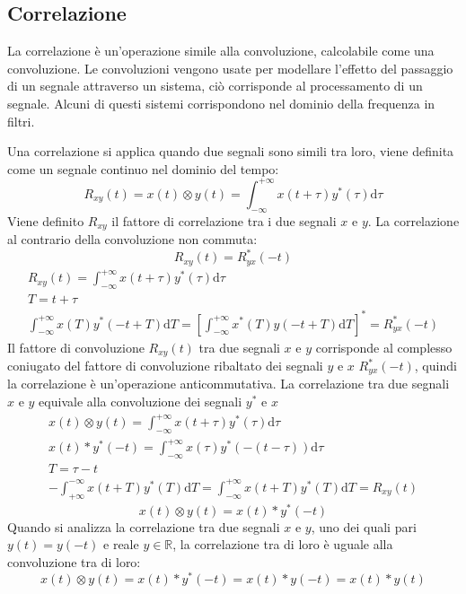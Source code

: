\documentclass{article}
\newcommand{\df}{\mathrm{d}}
\numberwithin{equation}{subsection}
\begin{document}
\subsection{Correlazione}
\label{sec:correlazione}
La correlazione è un'operazione simile alla convoluzione, calcolabile come una convoluzione. Le convoluzioni vengono usate per modellare l'effetto del passaggio di un segnale 
attraverso un sistema, ciò corrisponde al processamento di un segnale. Alcuni di questi sistemi corrispondono nel dominio della frequenza in filtri. 


Una correlazione si applica quando due segnali sono simili tra loro, viene definita come un segnale continuo nel dominio del tempo:
\begin{equation}
    R_{xy}(t)=x(t)\otimes y(t)=\int_{-\infty}^{+\infty}x(t+\tau)y^*(\tau)\df\tau
\end{equation}
Viene definito $R_{xy}$ il fattore di correlazione tra i due segnali $x$ e $y$. La correlazione al contrario della convoluzione non commuta: 
\begin{equation}
    R_{xy}(t)=R_{yx}^*(-t)
\end{equation}
\begin{gather*}
    \displaystyle R_{xy}(t)=\int_{-\infty}^{+\infty}x(t+\tau)y^*(\tau)\df\tau\\
    T=t+\tau\\
    \displaystyle\int_{-\infty}^{+\infty}x(T)y^*(-t+T)\df T=\left[\int_{-\infty}^{+\infty}x^*(T)y(-t+T)\df T\right]^*=R_{yx}^*(-t)
\end{gather*}
Il fattore di convoluzione $R_{xy}(t)$ tra due segnali $x$ e $y$ corrisponde al complesso coniugato del fattore di convoluzione ribaltato dei segnali $y$ e $x$ $R_{yx}^*(-t)$, 
quindi la correlazione è un'operazione anticommutativa. La correlazione tra due segnali $x$ e $y$ equivale alla convoluzione dei segnali $y^*$ e $x$
\begin{gather*}
    x(t)\otimes y(t)=\displaystyle\int_{-\infty}^{+\infty}x(t+\tau)y^*(\tau)\df\tau\\
    x(t)*y^*(-t)=\displaystyle\int_{-\infty}^{+\infty}x(\tau)y^*(-(t-\tau))\df\tau\\
    T=\tau-t\\
    -\int_{+\infty}^{-\infty}x(t+T)y^*(T)\df T=\int_{-\infty}^{+\infty}x(t+T)y^*(T)\df T=R_{xy}(t)
\end{gather*}
\begin{equation}
    x(t)\otimes y(t)=x(t)*y^*(-t)
\end{equation}
Quando si analizza la correlazione tra due segnali $x$ e $y$, uno dei quali pari $y(t)=y(-t)$ e reale $y\in\mathbb{R}$, la correlazione tra di loro è uguale alla convoluzione 
tra di loro:
\begin{equation*}
    x(t)\otimes y(t)=x(t)*y^*(-t)=x(t)*y(-t)=x(t)*y(t)
\end{equation*}
\end{document}
